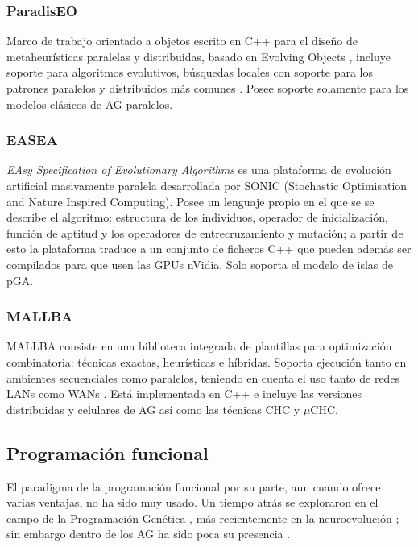 \documentclass[runningheads]{llncs}
\begin{document}
\subsubsection{ParadisEO}

Marco de trabajo orientado a objetos escrito en C++ para el diseño de metaheurísticas paralelas y distribuidas, basado en Evolving Objects \cite{Keijzer2001}, incluye soporte para algoritmos evolutivos, búsquedas locales con soporte para los patrones paralelos y distribuidos más comunes \cite{PARADISEO}. Posee soporte solamente para los modelos clásicos de AG paralelos.


\subsubsection{EASEA}

\emph{EAsy Specification of Evolutionary Algorithms} es una plataforma de evolución artificial masivamente paralela desarrollada por SONIC (Stochastic Optimisation and Nature Inspired Computing). Posee un lenguaje propio en el que se se describe el algoritmo: estructura de los individuos, operador de inicialización, función de aptitud y los operadores de entrecruzamiento y mutación; a partir de esto la plataforma traduce a un conjunto de ficheros C++ que pueden además ser compilados para que usen las GPUs nVidia. Solo soporta el modelo de islas de pGA.

\subsubsection{MALLBA}

MALLBA consiste en una biblioteca integrada de plantillas para optimización combinatoria: técnicas exactas, heurísticas e híbridas. Soporta ejecución tanto en ambientes secuenciales como paralelos, teniendo en cuenta el uso tanto de redes LANs como WANs \cite{MALLBA}. Está implementada en C++ e incluye las versiones distribuidas y celulares de AG así como las técnicas CHC y $\mu$CHC.

\subsection{Programación funcional}

El paradigma de la programación funcional por su parte, aun cuando ofrece varias ventajas, no ha sido muy usado. Un tiempo atrás se exploraron en el campo de la Programación Genética \cite{Briggs:2008:FGP:1375341.1375345,Huelsbergen:1996:TSE:1595536.1595579,walsh:1999:AFSFESIHLP}, más recientemente en la neuroevolución  \cite{Sher2013}; sin embargo dentro de los AG ha sido poca su presencia \cite{Hawkins:2001:GFG:872017.872197}.
\end{document}
